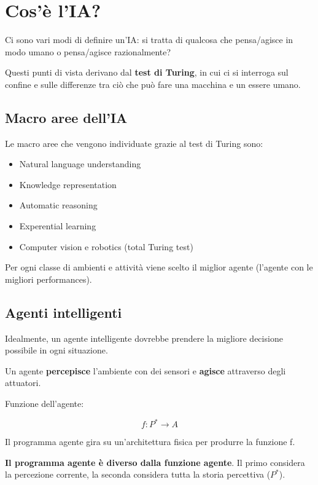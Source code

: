 \newpage

\section{Cos'è l'IA?}

Ci sono vari modi di definire un'IA: si tratta di qualcosa che pensa/agisce
in modo umano o pensa/agisce razionalmente?

Questi punti di vista derivano dal \textbf{test di Turing}, in cui ci si
interroga sul confine e sulle differenze tra ciò che può fare una macchina
e un essere umano.

\subsection{Macro aree dell'IA}

Le macro aree che vengono individuate grazie al test di Turing sono:

\begin{itemize}
 \item Natural language understanding
 \item Knowledge representation
 \item Automatic reasoning
 \item Experential learning
 \item Computer vision e robotics (total Turing test)
\end{itemize}

Per ogni classe di ambienti e attività viene scelto il miglior agente (l'agente
con le migliori performances).

\subsection{Agenti intelligenti}

Idealmente, un agente intelligente dovrebbe prendere la migliore decisione
possibile in ogni situazione.

Un agente \textbf{percepisce} l'ambiente con dei sensori e \textbf{agisce}
attraverso degli attuatori.

Funzione dell'agente:

\begin{equation}
f: P^* \rightarrow A
\end{equation}

Il programma agente gira su un'architettura fisica per produrre la funzione f.

\textbf{Il programma agente è diverso dalla funzione agente}.
Il primo considera la percezione corrente, la seconda considera tutta la
storia percettiva ($P^*$).

